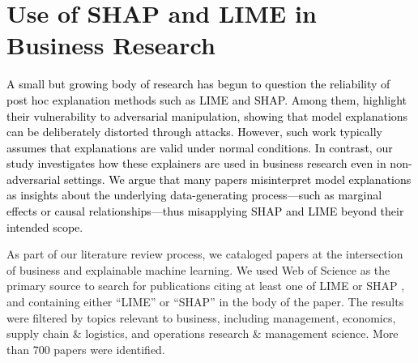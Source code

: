 \documentclass[mnsc,blindrev]{informs3}
\begin{document}
    
   
    
    
    \section{Use of SHAP and LIME in Business Research}
        \label{sec:use_in_b_research}





\textcolor{black}{A small but growing body of research has begun to question the reliability of post hoc explanation methods such as LIME and SHAP. Among them, \citep{slack19fooling} highlight their vulnerability to adversarial manipulation, showing that model explanations can be deliberately distorted through attacks. However, such work typically assumes that explanations are valid under normal conditions. In contrast, our study investigates how these explainers are used in business research even in non-adversarial settings. We argue that many papers misinterpret model explanations as insights about the underlying data-generating process—such as marginal effects or causal relationships—thus misapplying SHAP and LIME beyond their intended scope.}

As part of our literature review process, we cataloged papers at the intersection of business and explainable machine learning. We used Web of Science as the primary source to search for publications citing at least one of LIME \citep{ribeiro16lime} or SHAP \citep{lundberg17shap}, and containing either “LIME” or “SHAP” in the body of the paper. The results were filtered by topics relevant to business, including management, economics, supply chain \& logistics, and operations research \& management science. More than 700 papers were identified.
\end{document}

